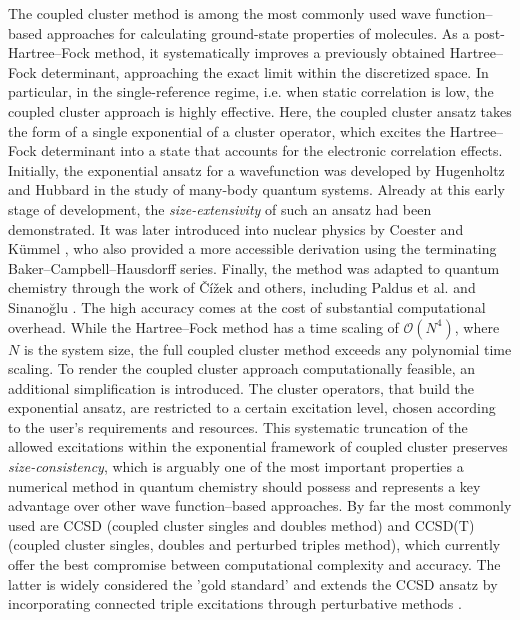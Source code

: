 \documentclass[reqno]{amsart}
\begin{document}
The coupled cluster method is among the most commonly used wave function–based approaches for calculating ground-state properties of molecules. As a post-Hartree–Fock method, it systematically improves a previously obtained Hartree–Fock determinant, approaching the exact limit within the discretized space. In particular, in the single-reference regime, i.e. when static correlation is low, the coupled cluster approach is highly effective. Here, the coupled cluster ansatz takes the form of a single exponential of a cluster operator, which excites the Hartree–Fock determinant into a state that accounts for the electronic correlation effects.  Initially, the exponential ansatz for a wavefunction was developed by Hugenholtz \cite{HUGENHOLTZ1957481} and Hubbard \cite{Hubbard} in the study of many-body quantum systems. Already at this early stage of development, the \textit{size-extensivity} of such an ansatz had been demonstrated. It was later introduced into nuclear physics by Coester and Kümmel \cite{Coest,COESTER1958421}, who also provided a more accessible derivation using the terminating Baker–Campbell–Hausdorff series. Finally, the method was adapted to quantum chemistry through the work of Čížek \cite{Cizek} and others, including Paldus et al. \cite{Paldus} and Sinanoğlu \cite{Sinanoglu}. The high accuracy comes at the cost of substantial computational overhead. While the Hartree–Fock method has a time scaling of $\mathcal{O}(N^4)$, where $N$ is the system size, the full coupled cluster method exceeds any polynomial time scaling. To render the coupled cluster approach computationally feasible, an additional simplification is introduced. The cluster operators, that build the exponential ansatz, are restricted to a certain excitation level, chosen according to the user’s requirements and resources. This systematic truncation of the allowed excitations within the exponential framework of coupled cluster preserves \textit{size-consistency}, which is arguably one of the most important properties a numerical method in quantum chemistry should possess and represents a key advantage over other wave function–based approaches. By far the most commonly used are CCSD (coupled cluster singles and doubles method) and CCSD(T) (coupled cluster singles, doubles and perturbed triples method), which currently offer the best compromise between computational complexity and accuracy. The latter is widely considered the 'gold standard' and extends the CCSD ansatz by incorporating connected triple excitations through perturbative methods \cite{CCSD_perT}.\\
\end{document}
